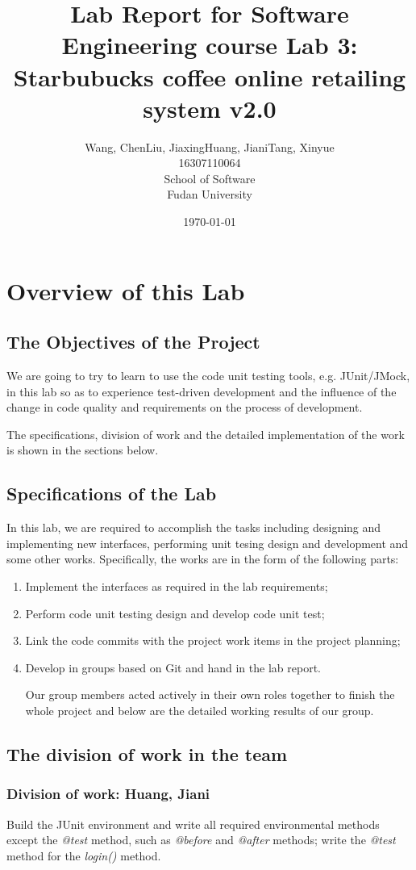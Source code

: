 \documentclass[a4paper]{report}
\title{Lab Report for Software Engineering course \newline
 Lab 3: Starbubucks coffee online retailing system v2.0}
\author{Wang, Chen\qquad Liu, Jiaxing\qquad Huang, Jiani\qquad Tang, Xinyue \\
16307110064\qquad17302010049\qquad 17302010063\qquad 16307110476 \\
School of Software\\
Fudan University
}
\date{\today}
\begin{document}
\maketitle

\tableofcontents
\chapter{Overview of this Lab}
\section{The Objectives of the Project}
We are going to try to learn to use the code unit testing tools, e.g. JUnit/JMock, in this lab so as to experience test-driven development and the influence of the change in code quality and requirements on the process of development.
\par
The specifications, division of work and the detailed implementation of the work is shown in the sections below.
\section{Specifications of the Lab}
In this lab, we are required to accomplish the tasks including designing and implementing new interfaces, performing unit tesing design and development and some other works. Specifically, the works are in the form of the following parts:
\begin{enumerate}
\item Implement the interfaces as required in the lab requirements;
\item Perform code unit testing design and develop code unit test;
\item Link the code commits with the project work items in the project planning;
\item Develop in groups based on Git and hand in the lab report.
\par
Our group members acted actively in their own roles together to finish the whole project and below are the detailed working results of our group.
\end{enumerate}
\section{The division of work in the team}
\subsection{Division of work: Huang, Jiani}
Build the JUnit environment and write all required environmental methods except the \emph{@test} method, such as \emph{@before} and \emph{@after} methods; write the \emph{@test} method for the \emph{login()} method.
\end{document}

